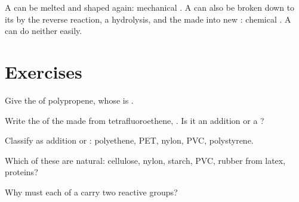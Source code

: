 \begin{remark}\label{rem:g12:polymers:recycling}
A  can be melted and shaped again: mechanical . A
 can also be broken down to its  by the
reverse reaction, a hydrolysis, and the  made into new :
chemical . A  can do neither easily.
\end{remark}

\section{Exercises}

\begin{exercise}[$\star$]\label{exo:g12:polymers:1}
Give the  of polypropene, whose  is
.
\end{exercise}

\begin{exercise}[$\star$]\label{exo:g12:polymers:2}
Write the  of the  made from tetrafluoroethene,
. Is it an addition or a ?
\end{exercise}

\begin{exercise}[$\star$]\label{exo:g12:polymers:3}
Classify as addition or : polyethene, PET, nylon,
PVC, polystyrene.
\end{exercise}

\begin{exercise}[$\star$]\label{exo:g12:polymers:4}
Which of these  are natural: cellulose, nylon, starch, PVC,
rubber from latex, proteins?
\end{exercise}

\begin{exercise}[$\star$]\label{exo:g12:polymers:5}
Why must each  of a  carry two reactive
groups?
\end{exercise}

